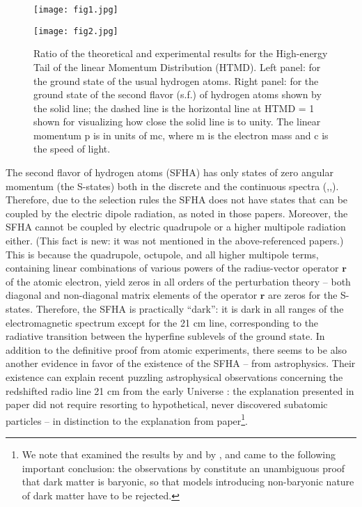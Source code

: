 \documentclass[referee]{raa}            %
\begin{document}
\begin{figure}[h]
	\begin{minipage}[t]{0.495\linewidth}
		\centering
		\texttt{[image: fig1.jpg]}
	\end{minipage}%
	\begin{minipage}[t]{0.495\textwidth}
		\centering
		\texttt{[image: fig2.jpg]}
	\end{minipage}%
	\caption{{\small  Ratio of the theoretical and experimental results for the High-energy Tail of the linear Momentum Distribution (HTMD). Left panel: for the ground state of the usual hydrogen atoms. Right panel: for the ground state of the second flavor (s.f.) of hydrogen atoms shown by the solid line; the dashed line is the horizontal line at HTMD = 1 shown for visualizing how close the solid line is to unity. The linear momentum p is in units of mc, where m is the electron mass and c is the speed of light.}}
	\label{fig12}
\end{figure}
The second flavor of hydrogen atoms (SFHA) has only states of zero angular momentum (the S-states) both in the discrete and the continuous spectra (\citealt{Oks+2001},\citealt{Oks+2020a},\citealt{Oks+2020b}). Therefore, due to the selection rules the SFHA does not have states that can be coupled by the electric dipole radiation, as noted in those papers.    
Moreover, the SFHA cannot be coupled by electric quadrupole or a higher multipole radiation either. (This fact is new: it was not mentioned in the above-referenced papers.) This is because the quadrupole, octupole, and all higher multipole terms, containing linear combinations of various powers of the radius-vector operator $\textbf{r}$ of the atomic electron, yield zeros in all orders of the perturbation theory – both diagonal and non-diagonal matrix elements of the operator $\textbf{r}$ are zeros for the S-states. Therefore, the SFHA is practically “dark”: it is dark in all ranges of the electromagnetic spectrum except for the 21 cm line, corresponding to the radiative transition between the hyperfine sublevels of the ground state.
In addition to the definitive proof from atomic experiments, there seems to be also another evidence in favor of the existence of the SFHA – from astrophysics. Their existence can explain recent puzzling astrophysical observations concerning the redshifted radio line 21 cm from the early Universe \citealt{Bowman+etal+2018}: the explanation presented in \cite{Oks+2020a} paper did not require resorting to hypothetical, never discovered subatomic particles – in distinction to the explanation from \cite{Barkana+2018} paper\footnote{We note that \cite{McGaugh+2018} examined the results by \cite{Bowman+etal+2018} and by \cite{Barkana+2018}, and came to the following important conclusion: the observations by \cite{Bowman+etal+2018} constitute an unambiguous proof that dark matter is baryonic, so that models introducing non-baryonic nature of dark matter have to be rejected.}.
\end{document}
